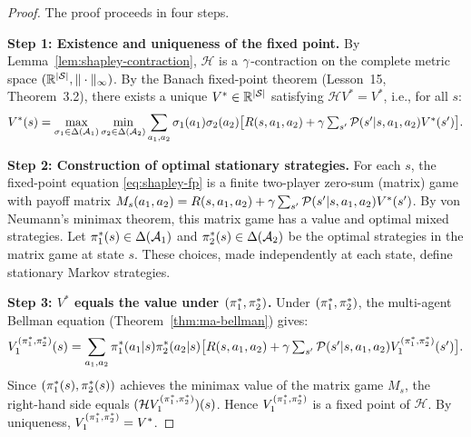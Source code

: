 \documentclass[11pt,a4paper]{article}
\begin{document}
\begin{proof}
The proof proceeds in four steps.

\textbf{Step 1: Existence and uniqueness of the fixed point.}
By Lemma~\ref{lem:shapley-contraction}, $\mathcal{H}$ is a
$\gamma$-contraction on the complete metric space
$(\mathbb{R}^{|\mathcal{S}|}, \|\cdot\|_\infty)$.  By the Banach fixed-point
theorem (Lesson~15, Theorem~3.2), there exists a unique
$V^* \in \mathbb{R}^{|\mathcal{S}|}$ satisfying $\mathcal{H} V^* = V^*$, i.e.,
for all $s$:
\begin{equation}
\label{eq:shapley-fp}
  V^*(s) = \max_{\sigma_1 \in \Delta(\mathcal{A}_1)}
  \min_{\sigma_2 \in \Delta(\mathcal{A}_2)}
  \sum_{a_1,a_2} \sigma_1(a_1)\sigma_2(a_2)
  \bigl[R(s,a_1,a_2) + \gamma \textstyle\sum_{s'}
    \mathcal{P}(s'|s,a_1,a_2) V^*(s')\bigr].
\end{equation}

\textbf{Step 2: Construction of optimal stationary strategies.}
For each $s$, the fixed-point equation \eqref{eq:shapley-fp} is
a finite two-player zero-sum (matrix) game with payoff matrix
$M_s(a_1,a_2) = R(s,a_1,a_2) + \gamma \sum_{s'}
\mathcal{P}(s'|s,a_1,a_2)V^*(s')$.  By von Neumann's minimax theorem,
this matrix game has a value and optimal mixed strategies.  Let
$\pi_1^*(s) \in \Delta(\mathcal{A}_1)$ and
$\pi_2^*(s) \in \Delta(\mathcal{A}_2)$ be the optimal strategies
in the matrix game at state $s$.  These choices, made independently
at each state, define stationary Markov strategies.

\textbf{Step 3: $V^*$ equals the value under $(\pi_1^*,
\pi_2^*)$.}  Under $(\pi_1^*, \pi_2^*)$, the
multi-agent Bellman equation (Theorem~\ref{thm:ma-bellman}) gives:
\begin{equation}
  V_1^{(\pi_1^*, \pi_2^*)}(s)
  = \sum_{a_1,a_2} \pi_1^*(a_1|s)\pi_2^*(a_2|s)
    \bigl[R(s,a_1,a_2) + \gamma \textstyle\sum_{s'}
    \mathcal{P}(s'|s,a_1,a_2) V_1^{(\pi_1^*,\pi_2^*)}(s')\bigr].
\end{equation}
Since $(\pi_1^*(s), \pi_2^*(s))$ achieves the minimax
value of the matrix game $M_s$, the right-hand side equals
$(\mathcal{H} V_1^{(\pi_1^*,\pi_2^*)})(s)$.  Hence
$V_1^{(\pi_1^*,\pi_2^*)}$ is a fixed point of
$\mathcal{H}$.  By uniqueness, $V_1^{(\pi_1^*,\pi_2^*)}
= V^*$.


\end{proof}
\end{document}
